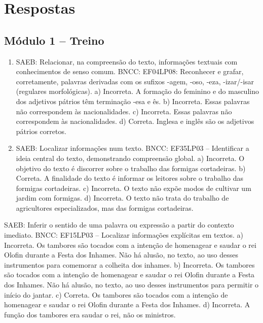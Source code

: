 
\chapter{Respostas}
\pagestyle{plain}
\footnotesize

\pagecolor{gray!40}

\section*{Módulo 1 – Treino}

\begin{enumerate}
\item
SAEB: Relacionar, na compreensão do texto, informações textuais
com conhecimentos de senso comum.
BNCC: EF04LP08: Reconhecer e grafar, corretamente, palavras derivadas
com os sufixos -agem, -oso, -eza, -izar/-isar (regulares morfológicas).
a) Incorreta. A formação do feminino e do masculino dos adjetivos
pátrios têm terminação -esa e ês.
b) Incorreta. Essas palavras não correspondem às nacionalidades.
c) Incorreta. Essas palavras não correspondem às nacionalidades.
d) Correta. Inglesa e inglês são os adjetivos pátrios corretos.

\item
SAEB: Localizar informações num texto.
BNCC: EF35LP03 -- Identificar a ideia central do texto, demonstrando
compreensão global.
a) Incorreta. O objetivo do texto é discorrer sobre o trabalho das
formigas cortadeiras.
b) Correta. A finalidade do texto é informar os leitores sobre o
trabalho das formigas cortadeiras.
c) Incorreta. O texto não expõe modos de cultivar um jardim com formigas.
d) Incorreta. O texto não trata do trabalho de agricultores 
especializados, mas das formigas cortadeiras.
\end{enumerate}

\item
SAEB: Inferir o sentido de uma palavra ou expressão a partir do
contexto imediato.
BNCC: EF15LP03 -- Localizar informações explícitas em textos.
a) Incorreta. Os tambores são tocados com a intenção de homenagear e
saudar o rei Olofin durante a Festa dos Inhames. Não há alusão, no texto, ao uso desses instrumentos para comemorar a colheita dos inhames.
b) Incorreta. Os tambores são tocados com a intenção de homenagear e
saudar o rei Olofin durante a Festa dos Inhames. Não há alusão, no texto, ao uso desses instrumentos para permitir o início do jantar.
c) Correta. Os tambores são tocados com a intenção de homenagear e
saudar o rei Olofin durante a Festa dos Inhames.
d) Incorreta. A função dos tambores era saudar o rei, não os ministros.


